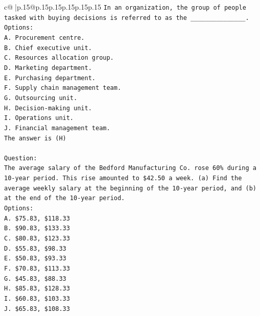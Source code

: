 \documentclass{article}
\begin{document}
{\begin{supertabular}{c@{$\;$}|p{.15\linewidth}@{}p{.15\linewidth}p{.15\linewidth}p{.15\linewidth}p{.15\linewidth}p{.15\linewidth}}
{{{\texttt{In an organization, the group of people tasked with buying decisions is referred to as the \_\_\_\_\_\_\_\_\_\_\_\_\_\_\_.} \\
\texttt{Options:} \\
\texttt{A. Procurement centre.} \\
\texttt{B. Chief executive unit.} \\
\texttt{C. Resources allocation group.} \\
\texttt{D. Marketing department.} \\
\texttt{E. Purchasing department.} \\
\texttt{F. Supply chain management team.} \\
\texttt{G. Outsourcing unit.} \\
\texttt{H. Decision{-}making unit.} \\
\texttt{I. Operations unit.} \\
\texttt{J. Financial management team.} \\
\texttt{The answer is (H)} \\
\\ 
\texttt{Question:} \\
\texttt{The average salary of the Bedford Manufacturing Co. rose 60\% during a 10{-}year period. This rise amounted to \$42.50 a week. (a) Find the average weekly salary at the beginning of the 10{-}year period, and (b) at the end of the 10{-}year period.} \\
\texttt{Options:} \\
\texttt{A. \$75.83, \$118.33} \\
\texttt{B. \$90.83, \$133.33} \\
\texttt{C. \$80.83, \$123.33} \\
\texttt{D. \$55.83, \$98.33} \\
\texttt{E. \$50.83, \$93.33} \\
\texttt{F. \$70.83, \$113.33} \\
\texttt{G. \$45.83, \$88.33} \\
\texttt{H. \$85.83, \$128.33} \\
\texttt{I. \$60.83, \$103.33} \\
\texttt{J. \$65.83, \$108.33} \\
            }
        }
    }
     \\ \\


\end{supertabular}}
\end{document}
